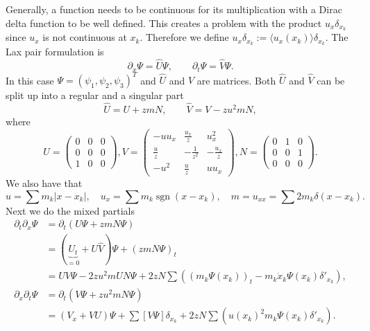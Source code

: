 \documentclass[english,master]{liumaiex}
\theoremstyle{thesisplain}
\theoremstyle{thesisdefinition}
\DeclareMathOperator{\sgn}{sgn}
\numberwithin{equation}{section}
\begin{document}
Generally, a function needs to be continuous for its multiplication with a Dirac delta function to be well defined. This creates a problem with the product $u_x \delta_{x_k}$ since $u_x$ is not continuous at $x_k$. Therefore we define $u_x \delta_{x_k} := \langle u_x(x_k) \rangle \delta_{x_k}$. The Lax pair formulation is
\begin{equation}
	\partial_x \Psi = \hat{U} \Psi, \qquad \partial_t \Psi = \hat{V} \Psi.
\end{equation}
In this case $\Psi = (\psi_1, \psi_2, \psi_3)^T$ and $\hat{U}$ and $\hat{V}$ are matrices. Both $\hat{U}$ and $\hat{V}$ can be split up into a regular and a singular part
%
\begin{equation}
\hat{U} = U + zmN, \qquad \hat{V} = V - zu^2mN,
\end{equation}
where
\begin{equation}
U =
	\begin{pmatrix}
	0 & 0 & 0 \\
	0 & 0 & 0 \\
	1 & 0 & 0
	\end{pmatrix},
V = 
	\begin{pmatrix}
	-u u_x & \frac{u_x}{z} & u_x^2 \\
	\frac{u}{z} & - \frac{1}{z^2} & - \frac{u_x}{z} \\
	-u^2 & \frac{u}{z} & uu_x
	\end{pmatrix},
N =
	\begin{pmatrix}
	0 & 1 & 0 \\
	0 & 0 & 1 \\
	0 & 0 & 0
	\end{pmatrix}.
\end{equation}
%
We also have that
\begin{equation}
	u = \sum m_k |x - x_k|, \quad u_x = \sum m_k \sgn(x - x_k), \quad m = u_{xx} = \sum 2 m_k \delta(x - x_k).
\end{equation}
Next we do the mixed partials
\begin{equation}
\begin{aligned}
	\partial_t \partial_x \Psi &= \partial_t (U \Psi + zmN \Psi) \\ 
	&= (\underbrace{U_t}_{=0} + U\hat{V}) \Psi + (zm N \Psi)_t \\
	&= UV \Psi - 2zu^2mUN\Psi + 2zN\sum ((m_k \Psi(x_k))_t - m_k \dot{x}_k\Psi(x_k)\delta'_{x_k}), \\
	\partial_x \partial_t \Psi &= \partial_t (V \Psi + zu^2mN \Psi) \\
	&= (V_x + VU) \Psi + \sum [ V \Psi ] \delta_{x_k} + 2zN \sum(u(x_k)^2 m_k \Psi(x_k) \delta'_{x_k}).
\end{aligned}
\end{equation}
\end{document}
